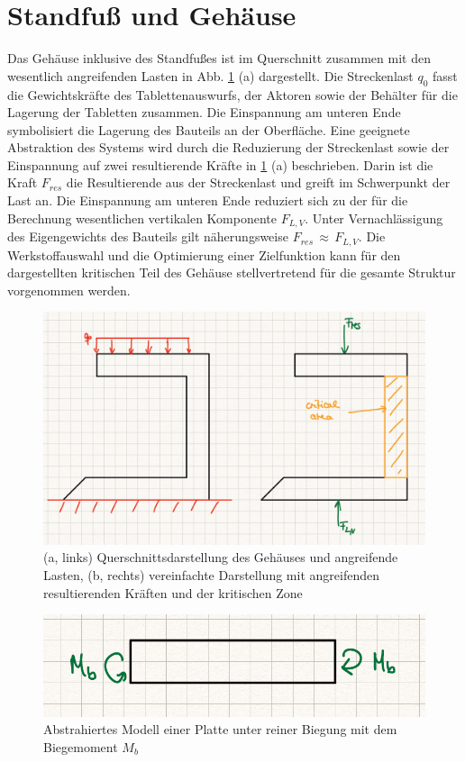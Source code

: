 \section{Standfuß und Gehäuse}
Das Gehäuse inklusive des Standfußes ist im Querschnitt zusammen mit den wesentlich angreifenden Lasten in Abb. \ref{fig:0301skizze} (a) dargestellt. Die Streckenlast $q_0$ fasst die Gewichtskräfte des Tablettenauswurfs, der Aktoren sowie der Behälter für die Lagerung der Tabletten zusammen. Die Einspannung am unteren Ende symbolisiert die Lagerung des Bauteils an der Oberfläche. Eine geeignete Abstraktion des Systems wird durch die Reduzierung der Streckenlast sowie der Einspannung auf zwei resultierende Kräfte in \ref{fig:0301skizze} (a) beschrieben. Darin ist die Kraft $F_{res}$ die Resultierende aus der Streckenlast und greift im Schwerpunkt der Last an. Die Einspannung am unteren Ende reduziert sich zu der für die Berechnung wesentlichen vertikalen Komponente $F_{L,V}$. Unter Vernachlässigung des Eigengewichts des Bauteils gilt näherungsweise $F_{res}\,\approx\,F_{L,V}$. Die Werkstoffauswahl und die Optimierung einer Zielfunktion kann für den dargestellten kritischen Teil des Gehäuse stellvertretend für die gesamte Struktur vorgenommen werden.
\begin{figure}[H]
	\centering
	\includegraphics[width=1.0\linewidth]{chapter/Bilder/0301skizze}
	\caption{(a, links) Querschnittsdarstellung des Gehäuses und angreifende Lasten, (b, rechts) vereinfachte Darstellung mit angreifenden resultierenden Kräften und der kritischen Zone}
	\label{fig:0301skizze}
\end{figure}
\begin{figure}[H]
	\centering
	\includegraphics[width=1.0\linewidth]{chapter/Bilder/0301modell}
	\caption{Abstrahiertes Modell einer Platte unter reiner Biegung mit dem Biegemoment $M_b$}
	\label{fig:0301model}
\end{figure}
